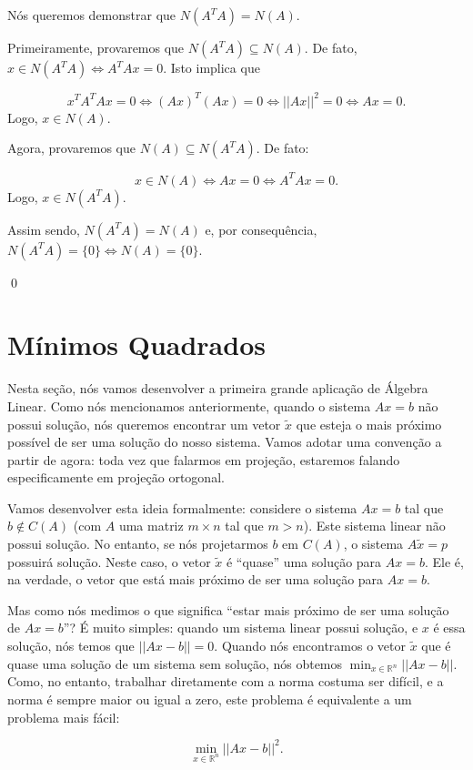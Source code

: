 \begin{Proof}
	Nós queremos demonstrar que $N(A^TA) = N(A)$. 
	
	Primeiramente, provaremos que $N(A^TA)\subseteq N(A)$. De fato, $x\in N(A^TA)\iff A^TAx = 0$. Isto implica que
	
	$$
	x^TA^TAx = 0\iff (Ax)^T(Ax) = 0\iff ||Ax||^2 = 0\iff Ax = 0.
	$$
	Logo, $x\in N(A)$.
	
	Agora, provaremos que $N(A)\subseteq N(A^TA)$. De fato:
	
	$$
	x\in N(A)\iff Ax = 0\iff A^TAx = 0.
	$$
	Logo, $x\in N(A^TA)$.
	
	Assim sendo, $N(A^TA) = N(A)$ e, por consequência, $N(A^TA) = \{0\}\iff N(A) = \{0\}$.
	
	\qed
\end{Proof}

\section{Mínimos Quadrados}

Nesta seção, nós vamos desenvolver a primeira grande aplicação de Álgebra Linear. Como nós mencionamos anteriormente, quando o sistema $Ax = b$ não possui solução, nós queremos encontrar um vetor $\tilde{x}$ que esteja o mais próximo possível de ser uma solução do nosso sistema. Vamos adotar uma convenção a partir de agora: toda vez que falarmos em projeção, estaremos falando especificamente em projeção ortogonal.

Vamos desenvolver esta ideia formalmente: considere o sistema $Ax = b$ tal que $b\notin C(A)$ (com $A$ uma matriz $m\times n$ tal que $m > n$). Este sistema linear não possui solução. No entanto, se nós projetarmos $b$ em $C(A)$, o sistema $A\tilde{x} = p$ possuirá solução. Neste caso, o vetor $\tilde{x}$ é ``quase'' uma solução para $Ax = b$. Ele é, na verdade, o vetor que está mais próximo de ser uma solução para $Ax = b$.

Mas como nós medimos o que significa ``estar mais próximo de ser uma solução de $Ax = b$''? É muito simples: quando um sistema linear possui solução, e $x$ é essa solução, nós temos que $||Ax - b|| = 0$. Quando nós encontramos o vetor $\tilde{x}$ que é quase uma solução de um sistema sem solução, nós obtemos $\min_{x\in\mathbb{R}^n}||Ax - b||$. Como, no entanto, trabalhar diretamente com a norma costuma ser difícil, e a norma é sempre maior ou igual a zero, este problema é equivalente a um problema mais fácil:

$$
\min_{x\in\mathbb{R}^n} ||Ax - b||^2.
$$

